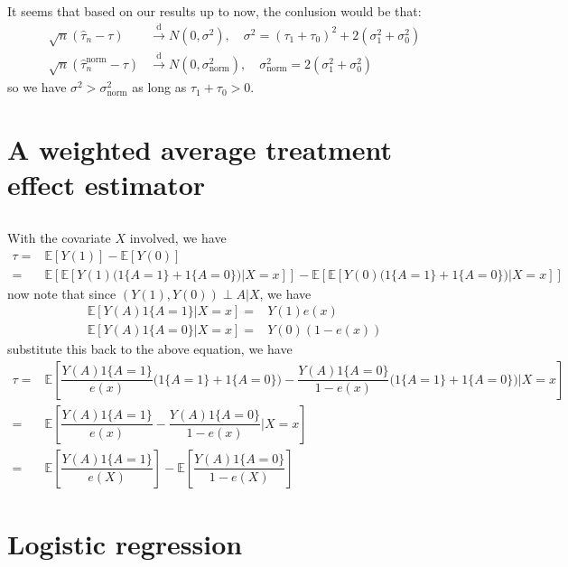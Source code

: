 \documentclass[11pt,a4paper]{ctexart}
\numberwithin{equation}{section}%
\begin{document}
\subsection{}

It seems that based on our results up to now, the conlusion would be that: 
\begin{align*}
    \sqrt{n} (\hat{\tau}_n-\tau)&\xrightarrow[]{\mathrm{d}} N(0, \sigma ^2),\quad \sigma ^2 = (\tau_1+\tau_0)^2 + 2(\sigma _1^2 + \sigma _0^2)\\
    \sqrt{n} (\hat{\tau}_n^\mathrm{ norm }-\tau)&\xrightarrow[]{\mathrm{d}} N(0, \sigma ^2_\mathrm{ norm }),\quad \sigma ^2_\mathrm{ norm } = 2(\sigma _1^2 + \sigma _0^2)
\end{align*}
so we have $ \sigma ^2>\sigma ^2_\mathrm{ norm  }  $ as long as $ \tau_1+\tau_0 > 0 $.





\section{A weighted average treatment effect estimator}
\subsection{}

With the covariate $ X $ involved, we have
\begin{align*}
    \tau =& \mathbb{E}\left[ Y(1) \right]  - \mathbb{E}\left[ Y(0) \right]\\
    =& \mathbb{E}\left[ \mathbb{E}\left[ Y(1)\big(1\{A=1\} + 1\{A=0\}\big) \big| X=x \right]  \right] - \mathbb{E}\left[ \mathbb{E}\left[ Y(0)\big(1\{A=1\} + 1\{A=0\}\big) \big| X=x \right]  \right]
\end{align*}
now note that since $ (Y(1),Y(0)) \perp A |X $, we have
\begin{align*}
    \mathbb{E}\left[ Y(A)1\{A=1\}|X=x \right] =& Y(1)e(x) \\
    \mathbb{E}\left[ Y(A)1\{A=0\}|X=x \right] =& Y(0)(1-e(x))
\end{align*}
substitute this back to the above equation, we have
\begin{align*}
    \tau =& \mathbb{E}\left[ \dfrac{ Y(A)1\{A=1\} }{ e(x) }\big(1\{A=1\} + 1\{A=0\}\big) - \dfrac{ Y(A)1\{A=0\} }{ 1-e(x) }\big(1\{A=1\} + 1\{A=0\}\big) \Big| X=x\right]\\
    =& \mathbb{E}\left[ \dfrac{ Y(A)1\{A=1\} }{ e(x) } - \dfrac{ Y(A)1\{A=0\} }{ 1-e(x) } \Big| X=x\right]\\
    =& \mathbb{E}\left[ \dfrac{ Y(A)1\{A=1\} }{ e(X) }  \right] - \mathbb{E}\left[ \dfrac{ Y(A)1\{A=0\} }{ 1-e(X) }  \right] 
\end{align*}

\subsection{}



\subsection{}


\section{Logistic regression}
\end{document}
